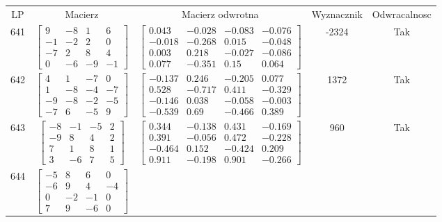 \documentclass[a4paper,12pt]{article}
\begin{document}
\bgroup {} \vspace{0.2in} \begin{tabular}{c c c c c}
LP & Macierz & Macierz odwrotna & Wyznacznik & Odwracalnosc\\
641
&
$\begin{bmatrix} 9 & -8 & 1 & 6 \\ -1 & -2 & 2 & 0 \\ -7 & 2 & 8 & 4 \\ 0 & -6 & -9 & -1 \end{bmatrix}$
&
$\begin{bmatrix} 0.043 & -0.028 & -0.083 & -0.076 \\ -0.018 & -0.268 & 0.015 & -0.048 \\ 0.003 & 0.218 & -0.027 & -0.086 \\ 0.077 & -0.351 & 0.15 & 0.064 \end{bmatrix}$
&
-2324
&
Tak
\\
642
&
$\begin{bmatrix} 4 & 1 & -7 & 0 \\ 1 & -8 & -4 & -7 \\ -9 & -8 & -2 & -5 \\ -7 & 6 & -5 & 9 \end{bmatrix}$
&
$\begin{bmatrix} -0.137 & 0.246 & -0.205 & 0.077 \\ 0.528 & -0.717 & 0.411 & -0.329 \\ -0.146 & 0.038 & -0.058 & -0.003 \\ -0.539 & 0.69 & -0.466 & 0.389 \end{bmatrix}$
&
1372
&
Tak
\\
643
&
$\begin{bmatrix} -8 & -1 & -5 & 2 \\ -9 & 8 & 4 & 2 \\ 7 & 1 & 8 & 1 \\ 3 & -6 & 7 & 5 \end{bmatrix}$
&
$\begin{bmatrix} 0.344 & -0.138 & 0.431 & -0.169 \\ 0.391 & -0.056 & 0.472 & -0.228 \\ -0.464 & 0.152 & -0.424 & 0.209 \\ 0.911 & -0.198 & 0.901 & -0.266 \end{bmatrix}$
&
960
&
Tak
\\
644
&
$\begin{bmatrix} -5 & 8 & 6 & 0 \\ -6 & 9 & 4 & -4 \\ 0 & -2 & -1 & 0 \\ 7 & 9 & -6 & 0 \end{bmatrix}$

\end{tabular}
\end{document}
